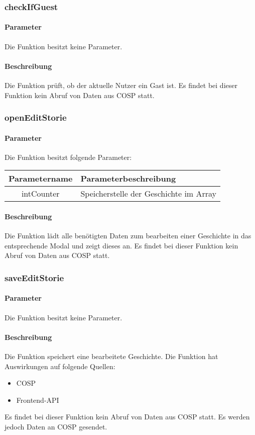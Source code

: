 \subsubsection{checkIfGuest}
\paragraph{Parameter} Die Funktion besitzt keine Parameter.
\paragraph{Beschreibung} Die Funktion prüft, ob der aktuelle Nutzer ein Gast ist. Es findet bei dieser Funktion kein Abruf von Daten aus {\glqq COSP\grqq} statt.
\subsubsection{openEditStorie}
\paragraph{Parameter} Die Funktion besitzt folgende Parameter:
\begin{table}[H]
	\begin{tabular}{|c|p{11cm}|}
		\hline
		\textbf{Parametername} & \textbf{Parameterbeschreibung} \\ \hline
		intCounter & Speicherstelle der Geschichte im Array \\ \hline
	\end{tabular}
\end{table}
\paragraph{Beschreibung} Die Funktion lädt alle benötigten Daten zum bearbeiten einer Geschichte in das entsprechende Modal und zeigt dieses an. Es findet bei dieser Funktion kein Abruf von Daten aus {\glqq COSP\grqq} statt.
\subsubsection{saveEditStorie}
\paragraph{Parameter} Die Funktion besitzt keine Parameter.
\paragraph{Beschreibung} Die Funktion speichert eine bearbeitete Geschichte. Die Funktion hat Auswirkungen auf folgende Quellen:
\begin{itemize}
	\item COSP
	\item Frontend-API
\end{itemize}
Es findet bei dieser Funktion kein Abruf von Daten aus {\glqq COSP\grqq} statt. Es werden jedoch Daten an {\glqq COSP\grqq} gesendet.
